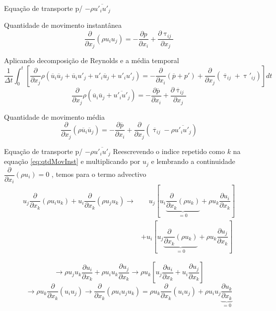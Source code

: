 \documentclass[10pt]{beamer}
\newcommand{\ddx}[2]{\dfrac{\partial #1}{\partial x_{#2}}}
\newcommand{\ddxp}[2]{\dfrac{\partial }{\partial x_{#2}}\left(#1\right)}
\newcommand{\m}[1]{\overline{#1}}
\begin{document}
\begin{frame}{Equação de transporte p/ $ -\rho \m{u'_i u'_j} $}
	\begin{block}{Quantidade de movimento instantânea}
		\begin{equation}\label{eq:qtdMovInst}
		\ddxp{\rho u_i u_j}{j} = - \ddx{p}{i} + \ddx{\uptau_{ij}}{j}
		\end{equation}
	\end{block}

	Aplicando decomposição de Reynolds e a média temporal
	\begin{equation*}
	\dfrac{1}{\Delta t} \int_{0}^{t} \left[ \ddx{ }{j} \rho (\m{u}_i\m{u}_j + \m{u}_i u'_j + u'_i\m{u}_j + u'_i u'_j ) = -\ddxp{\m{p} + p'}{i} + \ddxp{\m{\uptau}_{ij} + \uptau'_{ij}}{j} \right] dt
	\end{equation*}
	\begin{equation*}
	\ddx{ }{j} \rho (\m{u}_i\m{u}_j + \m{u'_i u'_j}) = - \ddx{\m{p}}{i} + \ddx{\m{\uptau}_{ij}}{j}
	\end{equation*}

	\begin{block}{Quantidade de movimento média}
	\begin{equation}\label{eq:qtdMovMean}
	\ddxp{\rho \m{u}_i\m{u}_j}{j} = - \ddx{\m{p}}{i} + \ddxp{\m{\uptau}_{ij} - \rho \m{u'_i u'_j}}{j}
	\end{equation}
	\end{block}
	
\end{frame}


\begin{frame}{Equação de transporte p/ $ -\rho \m{u'_i u'_j} $}
	Reescrevendo o indice repetido como $k$ na equação \ref{eq:qtdMovInst} e multiplicando por $ u_j $ e lembrando a continuidade $ \ddxp{\rho u_i}{i} = 0 $ , temos para o termo advectivo
	\begin{align*}
	u_j \ddxp{\rho u_i u_k}{k} + u_i \ddxp{\rho u_j u_k}{k} \rightarrow 
	&\;\;\;\; u_j \left[ u_i \underbrace{\ddxp{\rho u_k}{k}}_{=0} + \rho u_k\ddx{u_i}{k}\right] \\
	&+ u_i \left[ u_j \underbrace{\ddxp{\rho u_k}{k}}_{=0} + \rho u_k\ddx{u_j}{k}\right]
	\end{align*}
	
	\begin{equation*}
	\rightarrow \rho u_j u_k \ddx{u_i}{k} + \rho u_i u_k \ddx{u_j}{k} \rightarrow \rho u_k \left[ u_j \ddx{u_i}{k} + u_i \ddx{u_j}{k} \right]
	\end{equation*}
	\begin{equation*}
	\rightarrow \rho u_k \ddxp{u_i u_j}{k} \rightarrow \boxed{\ddxp{\rho u_i u_j u_k}{k}}
	= \rho u_k \ddxp{u_i u_j}{k} + \rho u_i u_j \underbrace{\ddx{u_k}{k}}_{=0}
	\end{equation*}
\end{frame}
\end{document}
